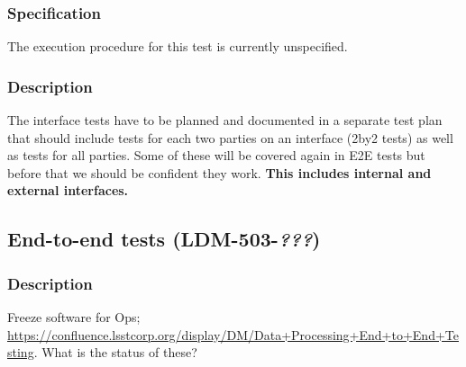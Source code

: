 \subsubsection{Specification}
The execution procedure for this test is currently unspecified.
\subsubsection{Description}
The interface tests have to be planned and documented in a separate test plan that should include tests for each two parties on an interface (2by2 tests) as well as tests for all parties.
Some of these will be covered again in E2E tests but before that we should be confident they work.
\textbf{This includes internal and external interfaces.}

\subsection{End-to-end tests (\textbf{LDM-503-\textit{???}})}
\subsubsection{Description}
Freeze software for Ops; \url{https://confluence.lsstcorp.org/display/DM/Data+Processing+End+to+End+Testing}.
What is the status of these?








